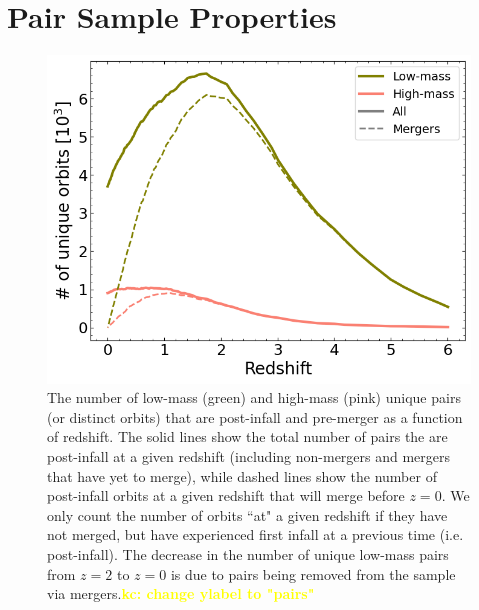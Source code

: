 \documentclass[twocolumn,linenumbers]{aastex631}
\newcommand{\kc}[1]{\textcolor{yellow}{\textbf{kc: #1}} }
\begin{document}
\section{Pair Sample Properties}

\begin{figure}[htb]
    \begin{center}
    \includegraphics[width=\columnwidth]{plots/bet-on-it/6_paircount.png}
    \caption{The number of low-mass (green) and high-mass (pink) unique pairs (or distinct orbits) that are post-infall and pre-merger as a function of redshift. 
    The solid lines show the total number of pairs the are post-infall at a given redshift (including non-mergers and mergers that have yet to merge), while dashed lines show the number of post-infall orbits at a given redshift that will merge before $z=0$.
    We only count the number of orbits ``at" a given redshift if they have not merged, but have experienced first infall at a previous time (i.e. post-infall). 
    The decrease in the number of unique low-mass pairs from $z=2$ to $z=0$ is due to pairs being removed from the sample via mergers.\kc{change ylabel to "pairs"}
    }
    \label{fig:numorbits}
    \end{center}
\end{figure}
\end{document}

